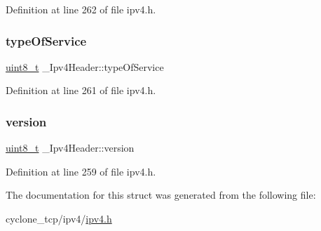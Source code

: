 Definition at line 262 of file ipv4.\+h.

\mbox{\label{struct__Ipv4Header_a9724ebee6b537157d5b8e735bdb3aa70}} 
\subsubsection{\texorpdfstring{type\+Of\+Service}{typeOfService}}
{\footnotesize\ttfamily \hyperlink{stdint_8h_aba7bc1797add20fe3efdf37ced1182c5}{uint8\+\_\+t} \+\_\+\+Ipv4\+Header\+::type\+Of\+Service}



Definition at line 261 of file ipv4.\+h.

\mbox{\label{struct__Ipv4Header_aefb3451dde5ac0d27d7a7b90e4040d70}} 
\subsubsection{\texorpdfstring{version}{version}}
{\footnotesize\ttfamily \hyperlink{stdint_8h_aba7bc1797add20fe3efdf37ced1182c5}{uint8\+\_\+t} \+\_\+\+Ipv4\+Header\+::version}



Definition at line 259 of file ipv4.\+h.



The documentation for this struct was generated from the following file\+:\begin{DoxyCompactItemize}
\item 
cyclone\+\_\+tcp/ipv4/\hyperlink{ipv4_8h}{ipv4.\+h}\end{DoxyCompactItemize}
